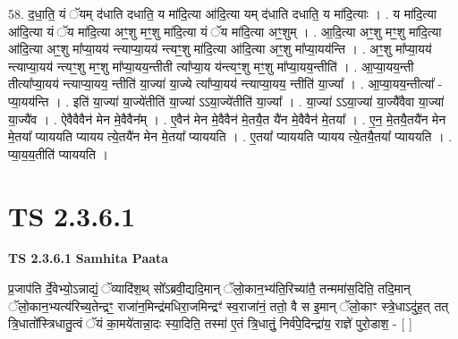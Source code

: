 \documentclass[17pt]{extarticle}
\begin{document}
58. द॒धा॒ति॒ यं ॅयम् द॑धाति दधाति॒ य मा॑दि॒त्या आ॑दि॒त्या यम् द॑धाति दधाति॒ य मा॑दि॒त्याः । . य मा॑दि॒त्या आ॑दि॒त्या यं ॅय मा॑दि॒त्या अꣳ॒॒शु मꣳ॒॒शु मा॑दि॒त्या यं ॅय मा॑दि॒त्या अꣳ॒॒शुम् । . आ॒दि॒त्या अꣳ॒॒शु मꣳ॒॒शु मा॑दि॒त्या आ॑दि॒त्या अꣳ॒॒शु मा᳚प्या॒यय॑ न्त्याप्या॒यय॑ न्त्यꣳ॒॒शु मा॑दि॒त्या आ॑दि॒त्या अꣳ॒॒शु मा᳚प्या॒यय॑न्ति । . अꣳ॒॒शु मा᳚प्या॒यय॑ न्त्याप्या॒यय॑ न्त्यꣳ॒॒शु मꣳ॒॒शु मा᳚प्या॒यय॒न्तीती त्या᳚प्या॒य य॑न्त्यꣳ॒॒शु मꣳ॒॒शु मा᳚प्या॒यय॒न्तीति॑ । . आ॒प्या॒यय॒न्ती तीत्या᳚प्या॒यय॑ न्त्याप्या॒यय॒ न्तीति॑ या॒ज्या॑ या॒ज्ये त्या᳚प्या॒यय॑ न्त्याप्या॒यय॒ न्तीति॑ या॒ज्या᳚ । . आ॒प्या॒यय॒न्तीत्या᳚ - प्या॒यय॑न्ति । . इति॑ या॒ज्या॑ या॒ज्ये॑तीति॑ या॒ज्या॑ ऽऽया॒ज्ये॑तीति॑ या॒ज्या᳚ । . या॒ज्या॑ ऽऽया॒ज्या॑ या॒ज्यै॑वैवा या॒ज्या॑ या॒ज्यै॑व । . ऐवैवैवैन॑ मेन मे॒वैवैन᳚म् । . ए॒वैन॑ मेन मे॒वैवैन॑ मे॒तयै॒त यै॑न मे॒वैवैन॑ मे॒तया᳚ । . ए॒न॒ मे॒तयै॒तयै॑न मेन मे॒तया᳚ प्याययति प्यायय त्ये॒तयै॑न मेन मे॒तया᳚ प्याययति । . ए॒तया᳚ प्याययति प्यायय त्ये॒तयै॒तया᳚ प्याययति । . प्या॒य॒य॒तीति॑ प्याययति । \newline
\pagebreak
{}

\section{ TS 2.3.6.1 }

\textbf{TS 2.3.6.1 } \newline
\textbf{Samhita Paata} \newline

प्र॒जाप॑ति र्दे॒वेभ्यो॒ऽन्नाद्यं॒ ॅव्यादि॑श॒थ् सो᳚ऽब्रवी॒द्यदि॒मान् ॅलो॒कान॒भ्य॑ति॒रिच्या॑तै॒ तन्ममा॑स॒दिति॒ तदि॒मान् ॅलो॒कान॒भ्यत्य॑रिच्य॒तेन्द्रꣳ॒॒ राजा॑न॒मिन्द्र॑मधिरा॒जमिन्द्रꣳ॑ स्व॒राजा॑नं॒ ततो॒ वै स इ॒मान् ॅलो॒काꣳ स्त्रे॒धाऽदु॑ह॒त् तत् त्रि॒धातो᳚स्त्रिधातु॒त्वं ॅयं का॒मये॑तान्ना॒दः स्या॒दिति॒ तस्मा॑ ए॒तं त्रि॒धातुं॒ निर्व॑पे॒दिन्द्रा॑य॒ राज्ञे॑ पुरो॒डाश॒ - [  ] \newline
\end{document}
